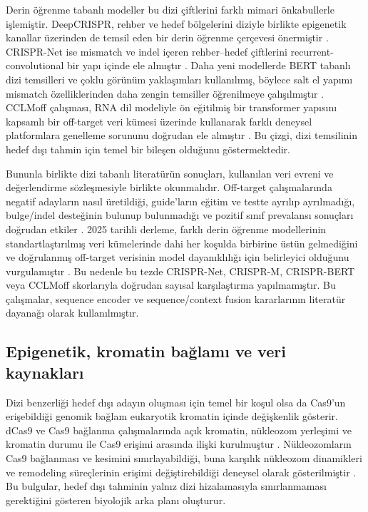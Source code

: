 Derin öğrenme tabanlı modeller bu dizi çiftlerini farklı mimari önkabullerle işlemiştir. DeepCRISPR, rehber ve hedef bölgelerini diziyle birlikte epigenetik kanallar üzerinden de temsil eden bir derin öğrenme çerçevesi önermiştir . CRISPR-Net ise mismatch ve indel içeren rehber--hedef çiftlerini recurrent-convolutional bir yapı içinde ele almıştır . Daha yeni modellerde BERT tabanlı dizi temsilleri ve çoklu görünüm yaklaşımları kullanılmış, böylece salt el yapımı mismatch özelliklerinden daha zengin temsiller öğrenilmeye çalışılmıştır . CCLMoff çalışması, RNA dil modeliyle ön eğitilmiş bir transformer yapısını kapsamlı bir off-target veri kümesi üzerinde kullanarak farklı deneysel platformlara genelleme sorununu doğrudan ele almıştır . Bu çizgi, dizi temsilinin hedef dışı tahmin için temel bir bileşen olduğunu göstermektedir.

Bununla birlikte dizi tabanlı literatürün sonuçları, kullanılan veri evreni ve değerlendirme sözleşmesiyle birlikte okunmalıdır. Off-target çalışmalarında negatif adayların nasıl üretildiği, guide'ların eğitim ve testte ayrılıp ayrılmadığı, bulge/indel desteğinin bulunup bulunmadığı ve pozitif sınıf prevalansı sonuçları doğrudan etkiler . 2025 tarihli derleme, farklı derin öğrenme modellerinin standartlaştırılmış veri kümelerinde dahi her koşulda birbirine üstün gelmediğini ve doğrulanmış off-target verisinin model dayanıklılığı için belirleyici olduğunu vurgulamıştır . Bu nedenle bu tezde CRISPR-Net, CRISPR-M, CRISPR-BERT veya CCLMoff skorlarıyla doğrudan sayısal karşılaştırma yapılmamıştır. Bu çalışmalar, sequence encoder ve sequence/context fusion kararlarının literatür dayanağı olarak kullanılmıştır.

\subsection{Epigenetik, kromatin bağlamı ve veri kaynakları}

Dizi benzerliği hedef dışı adayın oluşması için temel bir koşul olsa da Cas9'un erişebildiği genomik bağlam eukaryotik kromatin içinde değişkenlik gösterir. dCas9 ve Cas9 bağlanma çalışmalarında açık kromatin, nükleozom yerleşimi ve kromatin durumu ile Cas9 erişimi arasında ilişki kurulmuştur . Nükleozomların Cas9 bağlanması ve kesimini sınırlayabildiği, buna karşılık nükleozom dinamikleri ve remodeling süreçlerinin erişimi değiştirebildiği deneysel olarak gösterilmiştir . Bu bulgular, hedef dışı tahminin yalnız dizi hizalamasıyla sınırlanmaması gerektiğini gösteren biyolojik arka planı oluşturur.

